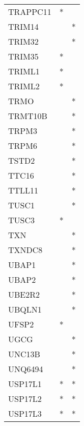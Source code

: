 \begin{longtable}{lcc}
TRAPPC11              &              * &            \\
TRIM14                &                &          * \\
TRIM32                &                &          * \\
TRIM35                &              * &            \\
TRIML1                &              * &            \\
TRIML2                &              * &            \\
TRMO                  &                &          * \\
TRMT10B               &                &          * \\
TRPM3                 &                &          * \\
TRPM6                 &                &          * \\
TSTD2                 &                &          * \\
TTC16                 &                &          * \\
TTLL11                &                &          * \\
TUSC1                 &                &          * \\
TUSC3                 &              * &            \\
TXN                   &                &          * \\
TXNDC8                &                &          * \\
UBAP1                 &                &          * \\
UBAP2                 &                &          * \\
UBE2R2                &                &          * \\
UBQLN1                &                &          * \\
UFSP2                 &              * &            \\
UGCG                  &                &          * \\
UNC13B                &                &          * \\
UNQ6494               &                &          * \\
USP17L1               &              * &          * \\
USP17L2               &              * &          * \\
USP17L3               &              * &          * \\

\end{longtable}
